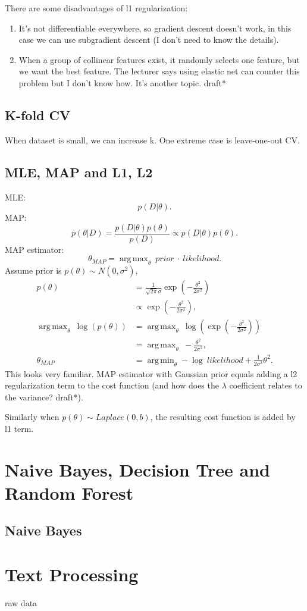 \documentclass{report}
\DeclareMathOperator*{\argmax}{arg\,max}
\DeclareMathOperator*{\argmin}{arg\,min}
\begin{document}
There are some disadvantages of l1 regularization:
\begin{enumerate}
	\item It's not differentiable everywhere, so gradient descent doesn't work, in this case we can use subgradient descent (I don't need to know the details).
	\item When a group of collinear features exist, it randomly selects one feature, but we want the best feature. The lecturer says using elastic net can counter this problem but I don't know how. It's another topic. draft*
\end{enumerate}

\section{K-fold CV}
When dataset is small, we can increase k. One extreme case is leave-one-out CV.

\section{MLE, MAP and L1, L2}
MLE: \[
	p(D|\theta)
.\] 
MAP:
\[
	p(\theta|D) = \frac{p(D|\theta)p(\theta)}{p(D)} \propto p(D|\theta)p(\theta)
.\] 
MAP estimator: \[
	\theta_{MAP} = \argmax_{\theta}\ prior\ \cdot\ likelihood
.\] 
Assume prior is $p(\theta) \sim N(0, \sigma^2)$,
\begin{align*}
	p(\theta) &= \frac{1}{\sqrt{2\pi} \sigma} \exp \left( -\frac{\theta^2}{2\sigma^2} \right) \\
		  &\propto \exp \left( -\frac{
		  \theta^2}{2\sigma^2} \right), \\
		  \argmax_{\theta}\ \log(p(\theta)) &= \argmax_{\theta}\ \log \left( \exp \left( -\frac{\theta^2}{2\sigma^2} \right) \right) \\ 
 &= \argmax_{\theta}\ -\frac{\theta^2}{2\sigma^2}, \\
		  \theta_{MAP} &= \argmin_{\theta} - \log \ likelihood +  \frac{1}{2\sigma^2} \theta^2
.\end{align*}
This looks very familiar. MAP estimator with Gaussian prior equals adding a l2 regularization term to the cost function (and how does the $\lambda$ coefficient relates to the variance? draft*).

Similarly when $p(\theta) \sim Laplace(0, b)$, the resulting cost function is added by l1 term.

\chapter{Naive Bayes, Decision Tree and Random Forest}
\section{Naive Bayes}

\chapter{Text Processing}
raw data 
\end{document}
